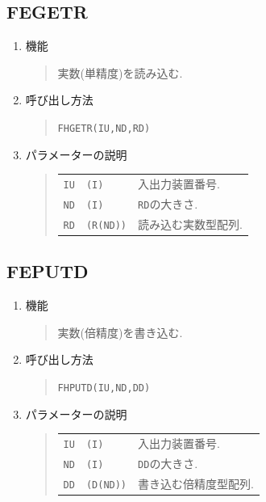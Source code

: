 \subsection{FEGETR}
\begin{enumerate}
  \item 機能 
  \begin{quote}
   実数(単精度)を読み込む.
  \end{quote}
  \item 呼び出し方法 
  \begin{quote}
    {\tt FHGETR(IU,ND,RD)}
  \end{quote}
  \item パラメーターの説明 
  \begin{quote}
    \begin{tabular}{llp{10cm}}
      {\tt IU}   & {\tt (I)} & 入出力装置番号. \\
      {\tt ND}   & {\tt (I)} & {\tt RD}の大きさ.\\
      {\tt RD}   & {\tt (R(ND))} & 読み込む実数型配列.
    \end{tabular}
  \end{quote}
\end{enumerate}

\subsection{FEPUTD}
\begin{enumerate}
  \item 機能
  \begin{quote}
   実数(倍精度)を書き込む.
  \end{quote}
  \item 呼び出し方法 
  \begin{quote}
    {\tt FHPUTD(IU,ND,DD)}
  \end{quote}
  \item パラメーターの説明 
  \begin{quote}
    \begin{tabular}{llp{10cm}}
      {\tt IU}   & {\tt (I)} & 入出力装置番号. \\
      {\tt ND}   & {\tt (I)} & {\tt DD}の大きさ.\\
      {\tt DD}   & {\tt (D(ND))} & 書き込む倍精度型配列.
    \end{tabular}
  \end{quote}
\end{enumerate}

